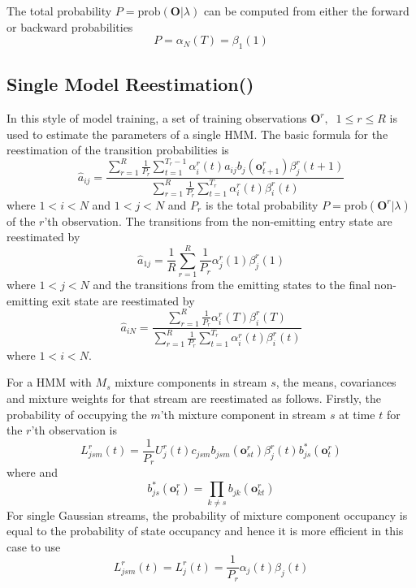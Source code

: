 The total probability $P = \mbox{prob}(\bm{O} | \lambda)$ can be computed
from either the forward or backward probabilities
\[
P = \alpha_N(T) = \beta_1(1)
\]

\subsection{Single Model Reestimation()}

In this style of model training, a set of training observations
$\bm{O}^r, \;\; 1 \leq r \leq R$ is used to estimate the 
parameters of a single HMM. The
basic formula for the reestimation of the transition probabilities is
\newcommand{\albe}[1]{
                  \sum_{r=1}^R \frac{1}{P_r}
                  \sum_{t=1}^{T_r}
                  \alpha^r_#1(t)\beta^r_#1(t)
}
\[
   \hat{a}_{ij} = \frac{
                  \sum_{r=1}^R \frac{1}{P_r}
                  \sum_{t=1}^{T_r-1}
                  \alpha^r_i(t)a_{ij}b_j(\bm{o}^r_{t+1})\beta^r_j(t+1)
                    }{\albe{i}}
\]
where $1<i<N$ and $1<j<N$ and $P_r$ is the total probability
$P = \mbox{prob}(\bm{O}^r | \lambda)$ of the $r$'th observation.  
The transitions from the non-emitting entry state are reestimated by
\[
   \hat{a}_{1j} = \frac{1}{R} 
                  \sum_{r=1}^R \frac{1}{P_r}
                  \alpha^r_j(1) \beta^r_j(1)
\]
where $1<j<N$ and the transitions from the emitting states to the final
non-emitting exit state are reestimated by
\[   
   \hat{a}_{iN} = \frac{
                  \sum_{r=1}^R \frac{1}{P_r}
                  \alpha^r_i(T)\beta^r_i(T)
                    }{
                  \sum_{r=1}^R \frac{1}{P_r}
                  \sum_{t=1}^{T_r}
                  \alpha^r_i(t)\beta^r_i(t)
                    }
\]
where $1<i<N$.

For a HMM with $M_s$ mixture components in stream $s$, the means, covariances
and mixture weights for that stream are reestimated as follows.
Firstly, the probability of occupying the $m$'th mixture component in stream
$s$ at time $t$ for the $r$'th observation is
\[
  L^r_{jsm}(t) = \frac{1}{P_r} U^r_j(t) c_{jsm} b_{jsm}(\bm{o}^r_{st})
                  \beta^r_j(t) b^*_{js}(\bm{o}^r_t)
\]
where
and
\[
     b^*_{js}(\bm{o}^r_t) = \prod_{k \neq s} b_{jk}(\bm{o}^r_{kt})
\]
For single Gaussian streams, the probability of mixture component occupancy is
equal to the probability of state occupancy and hence it is more efficient
in this case to use
\[
        L^r_{jsm}(t) =  L^r_{j}(t) = \frac{1}{P_r} \alpha_j(t) \beta_j(t)
\]


